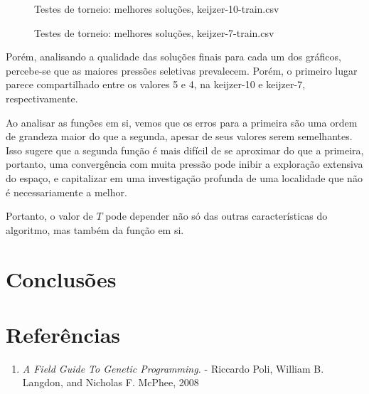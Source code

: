 \documentclass[11pt]{article}
\begin{document}
\begin{figure}[!ht]
	\centering
    \caption{Testes de torneio: melhores soluções, keijzer-10-train.csv}
    \label{fig:data}
\end{figure}

\begin{figure}[!ht]
	\centering
    \caption{Testes de torneio: melhores soluções, keijzer-7-train.csv}
    \label{fig:data}
\end{figure}

Porém, analisando a qualidade das soluções finais para cada um dos gráficos, percebe-se que as maiores pressões seletivas prevalecem. Porém, o primeiro lugar parece compartilhado entre os valores 5 e 4, na keijzer-10 e keijzer-7, respectivamente.

Ao analisar as funções em si, vemos que os erros para a primeira são uma ordem de grandeza maior do que a segunda, apesar de seus valores serem semelhantes. Isso sugere que a segunda função é mais difícil de se aproximar do que a primeira, portanto, uma convergência com muita pressão pode inibir a exploração extensiva do espaço, e capitalizar em uma investigação profunda de uma localidade que não é necessariamente a melhor.

Portanto, o valor de $T$ pode depender não só das outras características do algoritmo, mas também da função em si.

\section{Conclusões}

\section{Referências}

\begin{enumerate}
	\item \textit{A Field Guide To Genetic Programming.} - Riccardo Poli, William B. Langdon, and Nicholas F. McPhee, 2008
\end{enumerate}
\end{document}
